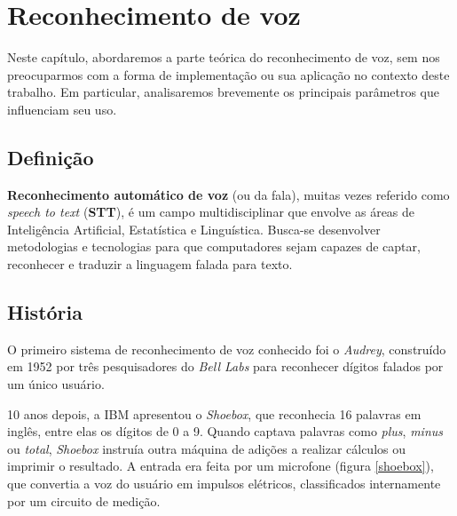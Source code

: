 \chapter{Reconhecimento de voz}
\label{cap:speech-recognition}

Neste capítulo, abordaremos a parte teórica do reconhecimento de voz, sem nos preocuparmos com a forma de implementação ou sua aplicação no contexto deste trabalho. Em particular, analisaremos brevemente os principais parâmetros que influenciam seu uso.


\section{Definição}


\textbf{Reconhecimento automático de voz} (ou da fala), muitas vezes referido como \textit{speech to text} (\textbf{STT}), é um campo multidisciplinar que envolve as áreas de Inteligência Artificial, Estatística e Linguística. Busca-se desenvolver metodologias e tecnologias para que computadores sejam capazes de captar, reconhecer e traduzir a linguagem falada para texto.


\section{História}

O primeiro sistema de reconhecimento de voz conhecido foi o \textit{Audrey}, construído em 1952 por três pesquisadores do \textit{Bell Labs} para reconhecer dígitos falados por um único usuário.

10 anos depois, a IBM apresentou o \textit{Shoebox}, que reconhecia 16 palavras em inglês, entre elas os dígitos de 0 a 9. Quando captava palavras como \textit{plus}, \textit{minus} ou \textit{total}, \textit{Shoebox} instruía outra máquina de adições a realizar cálculos ou imprimir o resultado. A entrada era feita por um microfone (figura \ref{shoebox}), que convertia a voz do usuário em impulsos elétricos, classificados internamente por um circuito de medição.


